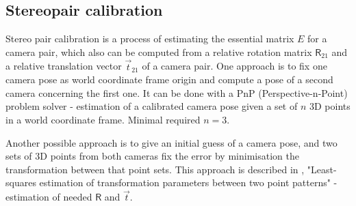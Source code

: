 \subsection{Stereopair calibration}

Stereo pair calibration is a process of estimating the essential matrix $E$ for a camera pair, which also can be computed from a relative rotation matrix $\pmb{\mathsf{R}}_{21}$ and a relative translation vector $\vec{t}_{21}$ of a camera pair. 
One approach is to fix one camera pose as world coordinate frame origin and compute a pose of a second camera concerning the first one. 
It can be done with a PnP (Perspective-n-Point) problem solver - estimation of a calibrated camera pose given a set of $n$ 3D points in a world coordinate frame. Minimal required $n=3$. 

Another possible approach is to give an initial guess of a camera pose, and two sets of 3D points from both cameras fix the error by minimisation the transformation between that point sets. This approach is described in \cite{Umeyama1991}, "Least-squares estimation of transformation parameters between two point patterns" - estimation of needed $\pmb{\mathsf{R}}$ and $\vec{t}$.